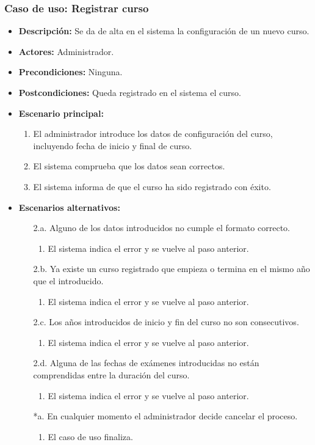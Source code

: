 \documentclass{book}
\begin{document}
\subsubsection*{Caso de uso: Registrar curso}
\begin{itemize}
\item{\bf Descripción:} Se da de alta en el sistema la configuración de un nuevo curso.
\item{\bf Actores:} Administrador.
\item{\bf Precondiciones:} Ninguna.
\item{\bf Postcondiciones:} Queda registrado en el sistema el curso.
\item{\bf Escenario principal:}
  \begin{enumerate}
  \item El administrador introduce los datos de configuración del curso, incluyendo fecha de inicio y final de curso.
  \item El sistema comprueba que los datos sean correctos.
  \item El sistema informa de que el curso ha sido registrado con éxito.
  \end{enumerate}
\item{\bf Escenarios alternativos:}
  \begin{itemize}
  \item[2.a.] Alguno de los datos introducidos no cumple el formato correcto.
    \begin{enumerate}
    \item El sistema indica el error y se vuelve al paso anterior.
    \end{enumerate}
  \item[2.b.] Ya existe un curso registrado que empieza o termina en el mismo año que el introducido.
    \begin{enumerate}
    \item El sistema indica el error y se vuelve al paso anterior.
    \end{enumerate}
  \item[2.c.] Los años introducidos de inicio y fin del curso no son consecutivos.
    \begin{enumerate}
    \item El sistema indica el error y se vuelve al paso anterior.
    \end{enumerate}
  \item[2.d.] Alguna de las fechas de exámenes introducidas no están comprendidas entre la duración del curso.
    \begin{enumerate}
    \item El sistema indica el error y se vuelve al paso anterior.
    \end{enumerate}
  \item[*a.] En cualquier momento el administrador decide cancelar el proceso.
    \begin{enumerate}
    \item El caso de uso finaliza.
    \end{enumerate}
  \end{itemize}
\end{itemize}
\end{document}
